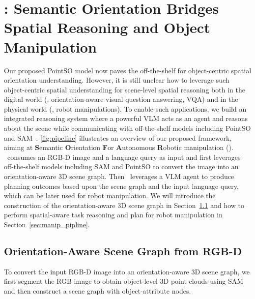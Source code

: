 \vspace{5pt}
\section{\sofar: Semantic Orientation Bridges
Spatial Reasoning and Object Manipulation}\label{sec:sofar_graph}
Our proposed PointSO model now paves the off-the-shelf for object-centric spatial orientation understanding.
However, it is still unclear how to leverage such object-centric spatial understanding for scene-level spatial reasoning both in the digital world (\eg, orientation-aware visual question answering, VQA) and in the physical world (\eg, robot manipulations).
To enable such applications, we build an integrated reasoning system where a powerful VLM acts as an agent and reasons about the scene while communicating with off-the-shelf models including PointSO and SAM~\cite{SAM23}. 
\cref{fig:pipeline} illustrates an overview of our proposed framework, aiming at \textbf{S}emantic \textbf{O}rientation \textbf{F}or \textbf{A}utonomous \textbf{R}obotic manipulation (\textbf{\sofar}). \sofar~consumes an RGB-D image and a language query as input and first leverages off-the-shelf models including SAM and PointSO to convert the image into an orientation-aware 3D scene graph. Then \sofar~leverages a VLM agent to produce planning outcomes based upon the scene graph and the input language query, which can be later used for robot manipulation. We will introduce the construction of the orientation-aware 3D scene graph in Section~\ref{sec:scene_graph} and how to perform spatial-aware task reasoning and plan for robot manipulation in Section~\ref{sec:manip_pipline}.



\subsection{Orientation-Aware Scene Graph from RGB-D}
\label{sec:scene_graph}
To convert the input RGB-D image into an orientation-aware 3D scene graph, we first segment the RGB image to obtain object-level 3D point clouds using SAM~\cite{SAM23} and then construct a scene graph with object-attribute nodes.


